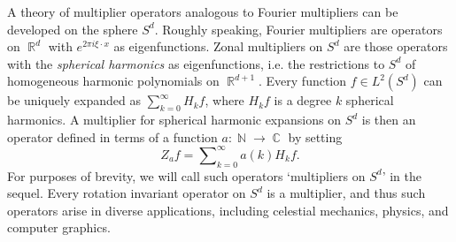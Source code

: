 \documentclass[11pt]{article}
\DeclareMathOperator{\RR}{\mathbb{R}}
\DeclareMathOperator{\NN}{\mathbb{N}}
\DeclareMathOperator{\CC}{\mathbb{C}}
\begin{document}
A theory of multiplier operators analogous to Fourier multipliers can be developed on the sphere $S^d$. Roughly speaking, Fourier multipliers are operators on $\RR^d$ with $e^{2 \pi i \xi \cdot x}$ as eigenfunctions. Zonal multipliers on $S^d$ are those operators with the \emph{spherical harmonics} as eigenfunctions, i.e. the restrictions to $S^d$ of homogeneous harmonic polynomials on $\RR^{d+1}$. Every function $f \in L^2(S^d)$ can be uniquely expanded as $\sum_{k = 0}^\infty H_k f$, where $H_k f$ is a degree $k$ spherical harmonics. A multiplier for spherical harmonic expansions on $S^d$ is then an operator defined in terms of a function $a: \NN \to \CC$ by setting
%
\[ Z_a f = \sum\nolimits_{k = 0}^\infty a(k) H_k f. \]
%
For purposes of brevity, we will call such operators `multipliers on $S^d$' in the sequel. Every rotation invariant operator on $S^d$ is a multiplier, and thus such operators arise in diverse applications, including celestial mechanics, physics, and computer graphics.



\end{document}
